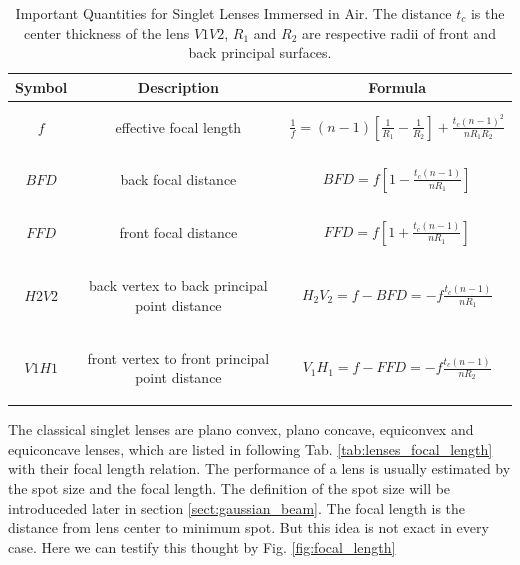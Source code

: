 \begin{table}[!ht]
\centering
\caption{Important Quantities for Singlet Lenses Immersed in Air. The distance $t_{c}$ is the center thickness of the lens $V1V2$,  $R_{1}$ and $R_{2}$ are respective radii of front and back principal surfaces\cite{lens_theory_LC_Ltd}.}
\begin{tabular}{|c|c|c|}
\hline
\textbf{Symbol}&\textbf{Description}&\textbf{Formula}\\
\hline
$f$ & \parbox[c]{6cm}{
						\begin{center}
						effective focal length
						\end{center}
				}& $\frac{1}{f}=(n-1)\left[\frac{1}{R_{1}}-\frac{1}{R_{2}} \right]+\frac{t_{c}(n-1)^2}{nR_{1}R_{2}}$ \\
\hline
$BFD$ &\parbox[c]{6cm}{
						\begin{center}
						back focal distance 
						\end{center}
			}& $BFD=f\left[ 1-\frac{t_{c}(n-1)}{nR_{1}}\right]$ \\
\hline
$FFD$ &\parbox[c]{6cm}{
						\begin{center}
						 front focal distance
						 \end{center} 
			}& $FFD=f\left[ 1+\frac{t_{c}(n-1)}{nR_{1}}\right]$ \\
\hline
$H2V2$ & \parbox[c]{6cm}{
						\begin{center}
						back vertex to back principal point distance
						\end{center}						
			} & $H_{2}V_{2}=f-BFD=-f\frac{t_{c}(n-1)}{nR_{1}}$ \\
\hline
$V1H1$ & \parbox[c]{6cm}{
						\begin{center}			
				    front vertex to front principal point distance
				    \end{center}
				 } & $V_{1}H_{1}=f-FFD=-f\frac{t_{c}(n-1)}{nR_{2}}$ \\
\hline
\end{tabular}
\label{tab:lens_quantities}
\end{table}
The classical singlet lenses are plano convex, plano concave, equiconvex and equiconcave lenses, which are listed in following Tab. \ref{tab:lenses_focal_length} with their focal length relation. The performance of a lens is usually estimated by the spot size and the focal length. The definition of the spot size will be introduceded later in section \ref{sect:gaussian_beam}. The focal length is the distance from lens center to minimum spot. But this idea is not exact in every case.  Here we can testify this thought by Fig. \ref{fig:focal_length} \\

